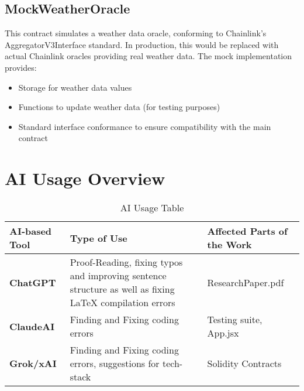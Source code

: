 \documentclass[11pt,a4paper]{article}
\begin{document}
		\subsection{MockWeatherOracle}\label{subsec:analysis-mock-weather-oracle}
		This contract simulates a weather data oracle, conforming to Chainlink's AggregatorV3Interface standard.
		In production, this would be replaced with actual Chainlink oracles providing real weather data.
		The mock implementation provides:

		\begin{itemize}
			\item Storage for weather data values
			\item Functions to update weather data (for testing purposes)
			\item Standard interface conformance to ensure compatibility with the main contract
		\end{itemize}

        \section{AI Usage Overview}\label{sec:AI-Usage}

        \begin{table}[htbp]
            \centering
            \caption{AI Usage Table}

            \label{tab:AI-usage}
            \begin{tabular}{|p{}|p{}|p{}|}
                \hline
                \textbf{AI-based Tool} & \textbf{Type of Use} & \textbf{Affected Parts of the Work} \\
                \hline
                \textbf{ChatGPT} & Proof-Reading, fixing typos and improving sentence structure as well as fixing LaTeX compilation errors & ResearchPaper.pdf \\
                \hline
                \textbf{ClaudeAI} & Finding and Fixing coding errors & Testing suite, App.jsx \\
                \hline
                \textbf{Grok/xAI} & Finding and Fixing coding errors, suggestions for tech-stack & Solidity Contracts \\
                \hline
            \end{tabular}
        \end{table}


	
\end{document}
